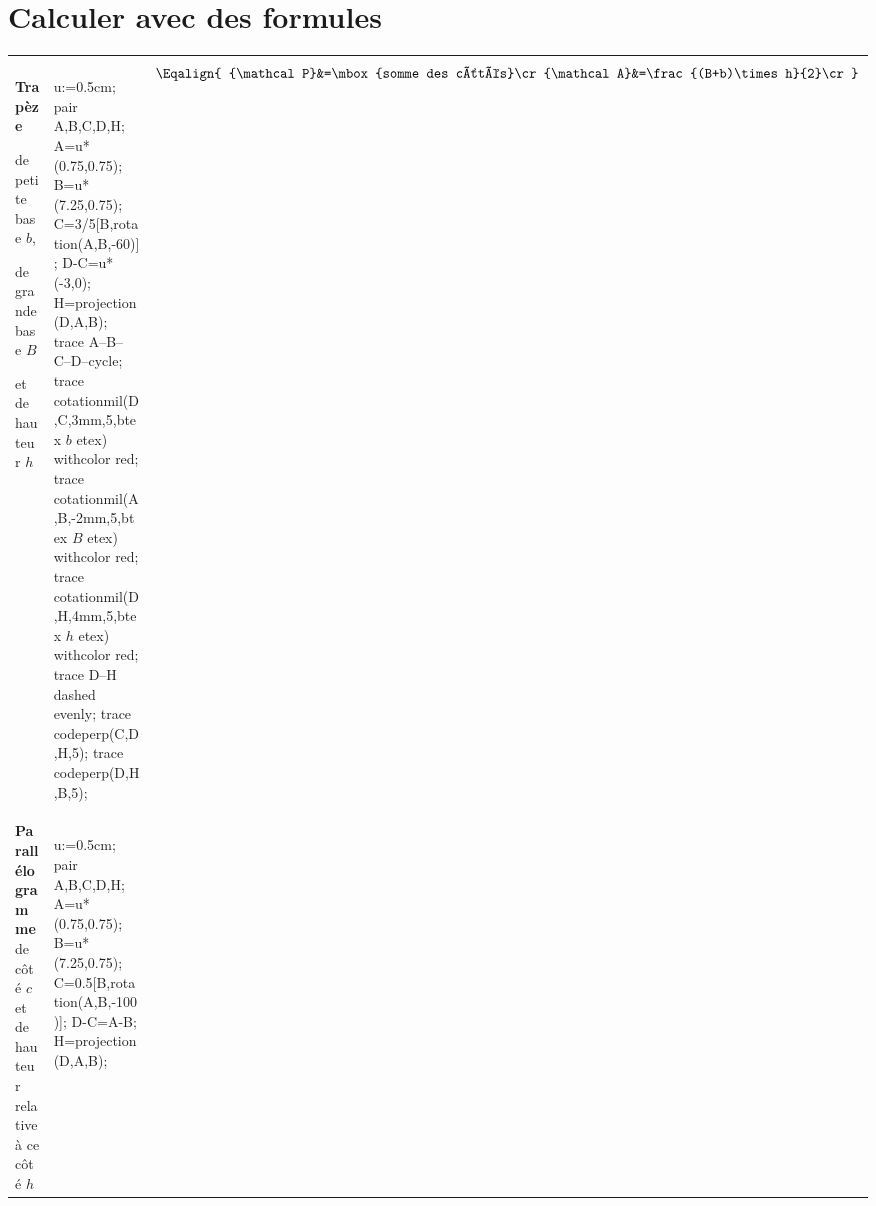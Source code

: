 \section{Calculer avec des formules}
{\renewcommand{\arraystretch}{1}
    \begin{center}
        \begin{longtable}{|>{\centering\arraybackslash}m{}|>{\centering\arraybackslash}m{}|>{\centering\arraybackslash}m{}|}    
            \hline
            {\bf Figure}&{\bf Représentation}&{\bf P\'erimètre et aire}\\
            \hline
            \endhead
            \multicolumn{3}{|c|}{\rule[-0.3cm]{0pt}{1cm}\LARGE\scshape Quadrilatères}\\\hline
            \textbf{ Trapèze} \par de petite base $b$,\par  de grande base $B$\par et de hauteur $h$
            &
            \rule[-0.5cm]{0pt}{3.2cm}            
            \begin{Geometrie}[CoinBG={(0,-.5u)},CoinHD={(8u,6.5u)}]    
                u:=0.5cm;
                pair A,B,C,D,H;
                A=u*(0.75,0.75);
                B=u*(7.25,0.75);
                C=3/5[B,rotation(A,B,-60)];
                D-C=u*(-3,0);
                H=projection(D,A,B);
                trace A--B--C--D--cycle;
                trace cotationmil(D,C,3mm,5,btex $b$ etex) withcolor red;
                trace cotationmil(A,B,-2mm,5,btex $B$ etex) withcolor red;
                trace cotationmil(D,H,4mm,5,btex $h$ etex) withcolor red;
                trace D--H dashed evenly;
                trace codeperp(C,D,H,5);
                trace codeperp(D,H,B,5);
            \end{Geometrie}
            &
            $\Eqalign{
            {\mathcal P}&=\mbox{somme des côtés}\cr
            {\mathcal A}&=\frac{(B+b)\times h}{2}\cr
            }$\\\hline
            \textbf{ Parallélogramme} de côté $c$ et de hauteur relative à ce côté $h$
            &
            \rule[-0.5cm]{0pt}{3.2cm}            
            \begin{Geometrie}[CoinBG={(0,-.5u)},CoinHD={(5u,4.5u)}]    
                u:=0.5cm;                
                pair A,B,C,D,H;
                A=u*(0.75,0.75);
                B=u*(7.25,0.75);
                C=0.5[B,rotation(A,B,-100)];
                D-C=A-B;
                H=projection(D,A,B);

\end{Geometrie}
\end{longtable}
\end{center}}

